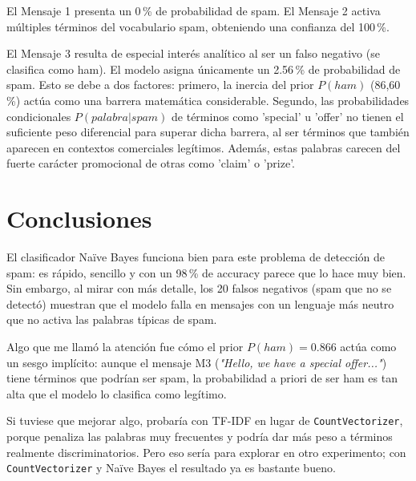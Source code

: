\documentclass[../../__memoria.tex]{subfiles}
\begin{document}
El Mensaje 1 presenta un 0\,\% de probabilidad de spam. El Mensaje 2 activa múltiples términos del vocabulario spam, obteniendo una confianza del 100\,\%. 

El Mensaje 3 resulta de especial interés analítico al ser un falso negativo (se clasifica como ham). El modelo asigna únicamente un 2.56\,\% de probabilidad de spam. Esto se debe a dos factores: primero, la inercia del prior $P(ham)$ (86,60\,\%) actúa como una barrera matemática considerable. Segundo, las probabilidades condicionales $P(palabra | spam)$ de términos como 'special' u 'offer' no tienen el suficiente peso diferencial para superar dicha barrera, al ser términos que también aparecen en contextos comerciales legítimos. Además, estas palabras carecen del fuerte carácter promocional de otras como 'claim' o 'prize'.

\section*{Conclusiones}

El clasificador Naïve Bayes funciona bien para este problema de detección de spam: es rápido, sencillo y con un 98\,\% de accuracy parece que lo hace muy bien. Sin embargo, al mirar con más detalle, los 20 falsos negativos (spam que no se detectó) muestran que el modelo falla en mensajes con un lenguaje más neutro que no activa las palabras típicas de spam.

Algo que me llamó la atención fue cómo el prior $P(ham)=0.866$ actúa como un sesgo implícito: aunque el mensaje M3 (\textit{"Hello, we have a special offer..."}) tiene términos que podrían ser spam, la probabilidad a priori de ser ham es tan alta que el modelo lo clasifica como legítimo. 

Si tuviese que mejorar algo, probaría con TF-IDF en lugar de \texttt{CountVectorizer}, porque penaliza las palabras muy frecuentes y podría dar más peso a términos realmente discriminatorios. Pero eso sería para explorar en otro experimento; con \texttt{CountVectorizer} y Naïve Bayes el resultado ya es bastante bueno.
\end{document}
